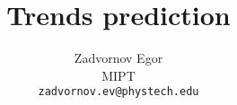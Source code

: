 

\documentclass{article}

\usepackage{arxiv}

\usepackage{multirow}
\usepackage{wrapfig}
\usepackage[T2A]{fontenc}			%
\usepackage[utf8]{inputenc}			%
\usepackage[english,russian]{babel}	%
\usepackage{hyperref}       %
\usepackage{url}    

\usepackage{amsmath,amsfonts,amssymb,amsthm,mathtools} 

\usepackage{booktabs}       %
\usepackage{amsfonts}       %
\usepackage{nicefrac}       %
\usepackage{microtype}      %
\usepackage{lipsum}
\usepackage{graphicx}
\usepackage{float}

\graphicspath{ {./images/} }



\usepackage{amsmath}


\title{Trends prediction}


\author{
  Zadvornov Egor \\
  MIPT\\
  \texttt{zadvornov.ev@phystech.edu} \\
}


